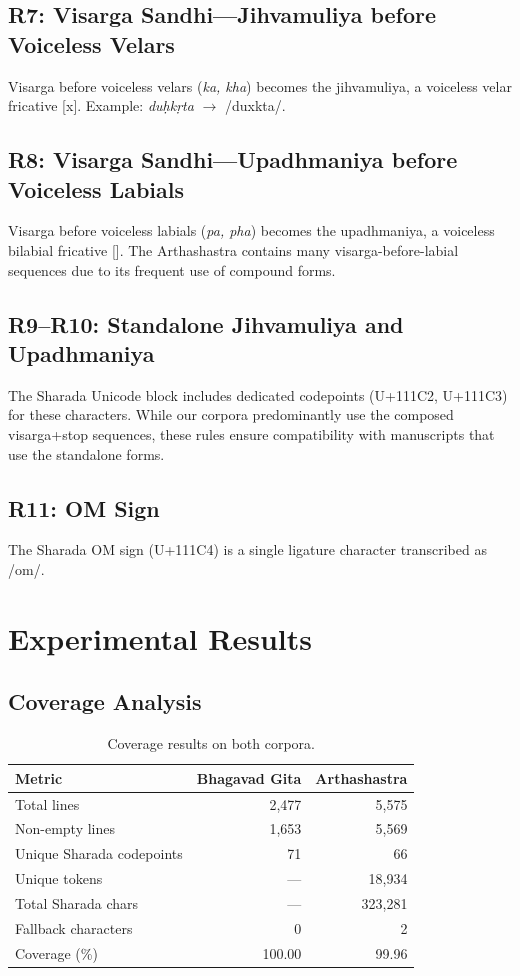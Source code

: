 \documentclass[11pt]{article}
\begin{document}
\subsection{R7: Visarga Sandhi---Jihvamuliya before Voiceless Velars}
Visarga before voiceless velars (\textit{ka, kha}) becomes the jihvamuliya, a voiceless velar fricative [x]. Example: \textit{du\d{h}k\d{r}ta} $\rightarrow$ /d\textsubbridge{}uxkt\textsubbridge{}a/.

\subsection{R8: Visarga Sandhi---Upadhmaniya before Voiceless Labials}
Visarga before voiceless labials (\textit{pa, pha}) becomes the upadhmaniya, a voiceless bilabial fricative []. The Arthashastra contains many visarga-before-labial sequences due to its frequent use of compound forms.

\subsection{R9--R10: Standalone Jihvamuliya and Upadhmaniya}
The Sharada Unicode block includes dedicated codepoints (U+111C2, U+111C3) for these characters. While our corpora predominantly use the composed visarga+stop sequences, these rules ensure compatibility with manuscripts that use the standalone forms.

\subsection{R11: OM Sign}
The Sharada OM sign (U+111C4) is a single ligature character transcribed as /o\textlengthmark m/.

\section{Experimental Results}

\subsection{Coverage Analysis}

\begin{table}[t]
\centering
\small
\begin{tabular}{lrr}
\toprule
\textbf{Metric} & \textbf{Bhagavad Gita} & \textbf{Arthashastra} \\
\midrule
Total lines & 2,477 & 5,575 \\
Non-empty lines & 1,653 & 5,569 \\
Unique Sharada codepoints & 71 & 66 \\
Unique tokens & --- & 18,934 \\
Total Sharada chars & --- & 323,281 \\
\midrule
Fallback characters & 0 & 2 \\
Coverage (\%) & 100.00 & 99.96 \\
\bottomrule
\end{tabular}
\caption{Coverage results on both corpora.}
\label{tab:coverage}
\end{table}
\end{document}
